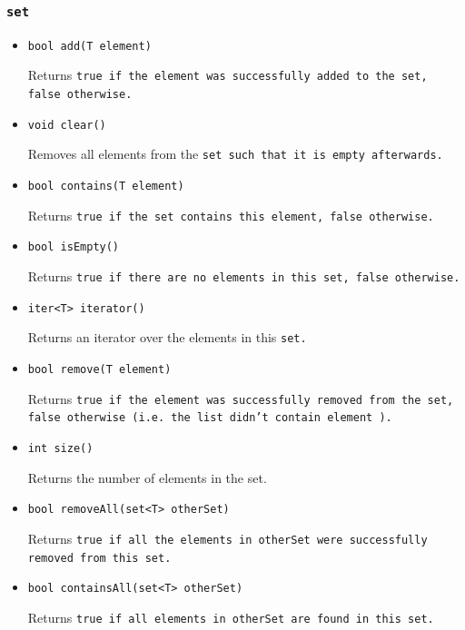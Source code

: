 \documentclass{article}
\begin{document}

\subsubsection{\tt set \rm} %
\label{ssub:tt_set_rm}

\begin{itemize}

  \item[] \tt bool add(T element) \rm
  
   Returns \tt true \rm if the element was successfully added to the \tt set\rm, \tt false \rm otherwise.
  
   \item[] \tt void clear() \rm
  
   Removes all elements from the \tt set \rm such that it is empty afterwards.
  
   \item[] \tt bool contains(T element) \rm
  
   Returns \tt true \rm if the \tt set \rm contains this element, \tt false \rm otherwise.
  
   \item[] \tt bool isEmpty() \rm
  
   Returns \tt true \rm if there are no elements in this \tt set\rm, \tt false \rm otherwise.
  
   \item[] \tt iter<T> iterator() \rm
  
   Returns an iterator over the elements in this \tt set\rm.
  
   \item[] \tt bool remove(T element) \rm
  
   Returns \tt true \rm if the element was successfully removed from the \tt set\rm, \tt false \rm otherwise (i.e. the \tt list
  \rm didn't contain \tt element \rm).
  
  \item[] \tt int size() \rm
  
  Returns the number of elements in the set.
  
  \item[] \tt bool removeAll(set<T> otherSet) \rm
  
  Returns \tt true \rm if all the elements in \tt otherSet \rm were successfully removed from this set.
  
  \item[] \tt bool containsAll(set<T> otherSet) \rm
  
  Returns \tt true \rm if all elements in \tt otherSet \rm are found in this set.
  
  \end{itemize}
\end{document}
